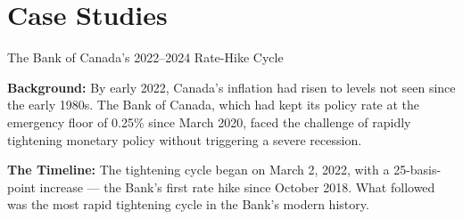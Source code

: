 \section{Case Studies}
\label{sec:ch2_casestudies}

\begin{casestudy}{The Bank of Canada's 2022--2024 Rate-Hike Cycle}

\textbf{Background:} By early 2022, Canada's inflation had risen to levels
not seen since the early 1980s. The Bank of Canada, which had kept its
policy rate at the emergency floor of 0.25\% since March 2020, faced the
challenge of rapidly tightening monetary policy without triggering a
severe recession.

\textbf{The Timeline:} The tightening cycle began on March 2, 2022, with
a 25-basis-point increase --- the Bank's first rate hike since October 2018.
What followed was the most rapid tightening cycle in the Bank's modern
history.


\end{casestudy}
